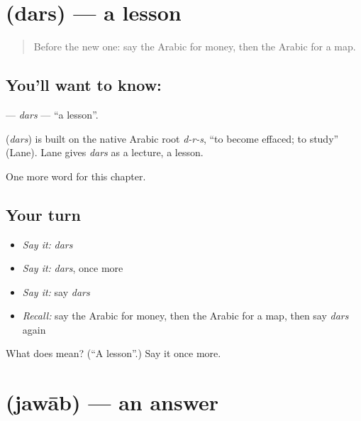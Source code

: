 \section[\texorpdfstring{\ar{درس} (dars)}{درس (dars)}]{ (dars) — a lesson}

\label{lesson:AR-C74-dars}



\begin{quote}
Before the new one: say the Arabic for money, then the Arabic for a map.
\end{quote}

\subsection*{You'll want to know: }
\textbf{} — \emph{dars} — \textquotedblleft{}a lesson\textquotedblright{}.

\begin{cousinweb}
\textbf{} (\emph{dars}) is built on the native Arabic root \emph{d-r-s}, \textquotedblleft{}to become effaced; to study\textquotedblright{} (Lane). Lane gives \emph{dars} as a lecture, a lesson.
\end{cousinweb}

\begin{grammarlens}[title={What you've built}]
One more word for this chapter.
\end{grammarlens}

\subsection*{Your turn}
\begin{itemize}
\raggedright
  \item \emph{Say it:} \emph{dars}
  \item \emph{Say it:} \emph{dars}, once more
  \item \emph{Say it:} say \emph{dars}
  \item \emph{Recall:} say the Arabic for money, then the Arabic for a map, then say \emph{dars} again
\end{itemize}

\begin{tcolorbox}[breakable,colback=teal!4,colframe=teal!35!black,title={Before you move on}]
What does  mean? (\textquotedblleft{}A lesson\textquotedblright{}.) Say it once more.
\end{tcolorbox}
\section[\texorpdfstring{\ar{جواب} (jawāb)}{جواب (jawāb)}]{ (jawāb) — an answer}

